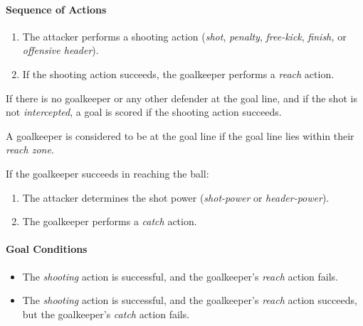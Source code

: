 \documentclass[12pt]{article}
\begin{document}
\paragraph{Sequence of Actions}

\begin{rulebox}
\begin{enumerate}
\item The attacker performs a shooting action (\emph{shot}, \emph{penalty}, \emph{free-kick}, \emph{finish, }or \emph{offensive header}).
\item If the shooting action succeeds, the goalkeeper performs a \emph{reach }action.
\end{enumerate}
\end{rulebox}

\begin{specialcase}
If there is no goalkeeper or any other defender at the goal line, and if the shot is not \emph{intercepted}, a goal is scored if the shooting action succeeds.
\par\medskip
A goalkeeper is considered to be at the goal line if the goal line lies within their \emph{reach zone}.
\end{specialcase}

If the goalkeeper succeeds in reaching the ball:

\begin{rulebox}
\begin{enumerate}
\item The attacker determines the shot power (\emph{shot-power} or \emph{header-power}).
\item The goalkeeper performs a \emph{catch }action.
\end{enumerate}
\end{rulebox}

\paragraph{Goal Conditions}

\begin{rulebox}
\begin{itemize}
\item The \emph{shooting} action is successful, and the goalkeeper's \emph{reach} action fails.
\item The \emph{shooting} action is successful, and the goalkeeper's \emph{reach} action succeeds, but the goalkeeper's \emph{catch} action fails.
\end{itemize}
\end{rulebox}
\end{document}
